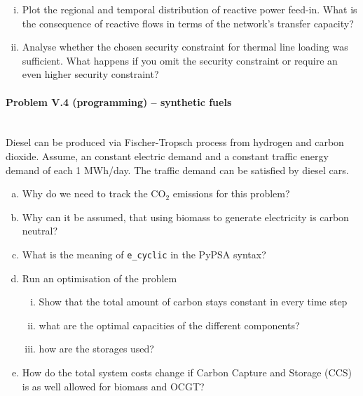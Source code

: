 \documentclass[11pt,a4paper,fleqn]{scrartcl}
\begin{document}
\begin{enumerate}[(a)]
       \begin{enumerate}[(i)]
        \item Plot the regional and temporal distribution of reactive power feed-in. What is the consequence of reactive flows in terms of the network's transfer capacity?
        \item Analyse whether the chosen security constraint for thermal line loading  was sufficient. What happens if you omit the security constraint or require an even higher security constraint?
       \end{enumerate}
\end{enumerate}


\paragraph{Problem V.4 (programming) -- synthetic fuels}~\\
Diesel can be produced via Fischer-Tropsch process from hydrogen and carbon dioxide. Assume, an constant electric demand and a constant traffic energy demand of each 1 MWh/day. The traffic demand can be satisfied by diesel cars.
\begin{enumerate}[(a)]
	\item Why do we need to track the CO$_2$ emissions for this problem?
	\item Why can it be assumed, that using biomass to generate electricity is carbon neutral?
	\item What is the meaning of \texttt{e\_cyclic} in the PyPSA syntax?
	\item Run an optimisation of the problem
		\begin{enumerate}[(i)]
		\item Show that the total amount of carbon stays constant in every time step
		\item what are the optimal capacities of the different components?
		\item how are the storages used?
		\end{enumerate}
	\item How do the total system costs change if Carbon Capture and Storage (CCS) is as well allowed for biomass and OCGT?
\end{enumerate} 
\end{document}
